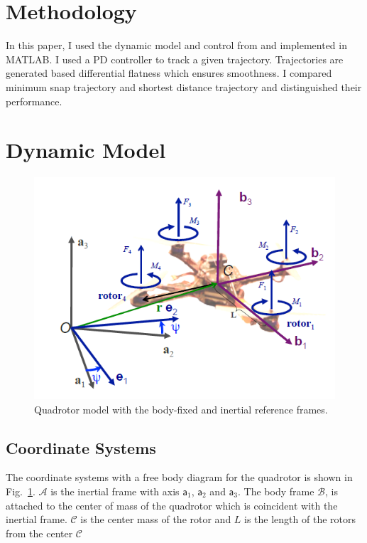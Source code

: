 \documentclass[conference,onecolumn,10pt]{IEEEtran}
\begin{document}
\section{Methodology}
In this paper, I used the dynamic model and control from \cite{mellinger2011minimum} and implemented in MATLAB. I used a PD controller to track a given trajectory. Trajectories are generated based differential flatness which ensures smoothness. I compared minimum snap trajectory and shortest distance trajectory and distinguished their performance. 

\section{Dynamic Model}
\begin{figure}[h!]
\centering
\includegraphics[scale=0.4]{images/Quadmodel.png}
\caption{Quadrotor model with the body-fixed and inertial reference frames.}
\label{Quadmodel}
\end{figure}
\subsection{Coordinate Systems}
The coordinate systems with a free body diagram for the quadrotor is shown in Fig.~\ref{Quadmodel}. $\mathcal{A}$ is the inertial frame with axis $\mathsf{a}_1$, $\mathsf{a}_2$ and $\mathsf{a}_3$. The body frame $\mathcal{B}$, is attached to the center of mass of the quadrotor which is coincident with the inertial frame. $\mathcal{C}$ is the center mass of the rotor and ${L}$ is the length of the rotors from the center $\mathcal{C}$
\end{document}
